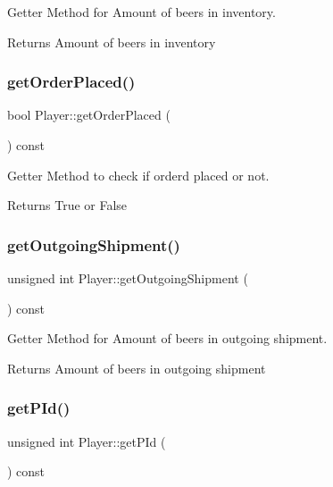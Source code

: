 Getter Method for Amount of beers in inventory. 

\begin{DoxyReturn}{Returns}
Amount of beers in inventory 
\end{DoxyReturn}
\mbox{\label{classPlayer_a266523063d6642e14894dec606f31e45}} 
\subsubsection{\texorpdfstring{get\+Order\+Placed()}{getOrderPlaced()}}
{\footnotesize\ttfamily bool Player\+::get\+Order\+Placed (\begin{DoxyParamCaption}{ }\end{DoxyParamCaption}) const}



Getter Method to check if orderd placed or not. 

\begin{DoxyReturn}{Returns}
True or False 
\end{DoxyReturn}
\mbox{\label{classPlayer_afd54f2f323e1430efda2acd30163e7ff}} 
\subsubsection{\texorpdfstring{get\+Outgoing\+Shipment()}{getOutgoingShipment()}}
{\footnotesize\ttfamily unsigned int Player\+::get\+Outgoing\+Shipment (\begin{DoxyParamCaption}{ }\end{DoxyParamCaption}) const}



Getter Method for Amount of beers in outgoing shipment. 

\begin{DoxyReturn}{Returns}
Amount of beers in outgoing shipment 
\end{DoxyReturn}
\mbox{\label{classPlayer_aec4626d021f2729c52306e7d303ddcff}} 
\subsubsection{\texorpdfstring{get\+P\+Id()}{getPId()}}
{\footnotesize\ttfamily unsigned int Player\+::get\+P\+Id (\begin{DoxyParamCaption}{ }\end{DoxyParamCaption}) const}



